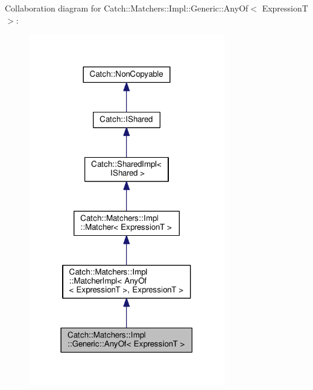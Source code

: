 Collaboration diagram for Catch\+:\+:Matchers\+:\+:Impl\+:\+:Generic\+:\+:Any\+Of$<$ ExpressionT $>$\+:
\nopagebreak
\begin{figure}[H]
\begin{center}
\leavevmode
\includegraphics[width=243pt]{classCatch_1_1Matchers_1_1Impl_1_1Generic_1_1AnyOf__coll__graph}
\end{center}
\end{figure}
